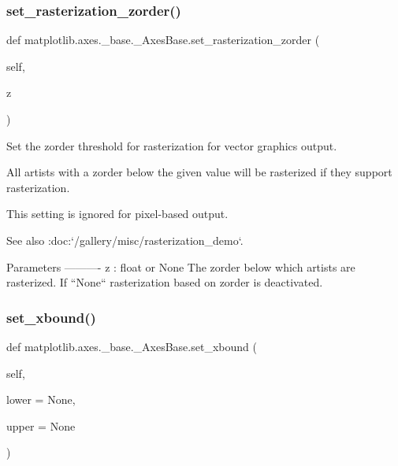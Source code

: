 \subsubsection{\texorpdfstring{set\+\_\+rasterization\+\_\+zorder()}{set\_rasterization\_zorder()}}
{\footnotesize\ttfamily def matplotlib.\+axes.\+\_\+base.\+\_\+\+Axes\+Base.\+set\+\_\+rasterization\+\_\+zorder (\begin{DoxyParamCaption}\item[{}]{self,  }\item[{}]{z }\end{DoxyParamCaption})}

\begin{DoxyVerb}Set the zorder threshold for rasterization for vector graphics output.

All artists with a zorder below the given value will be rasterized if
they support rasterization.

This setting is ignored for pixel-based output.

See also :doc:`/gallery/misc/rasterization_demo`.

Parameters
----------
z : float or None
    The zorder below which artists are rasterized.
    If ``None`` rasterization based on zorder is deactivated.
\end{DoxyVerb}
 \mbox{\label{classmatplotlib_1_1axes_1_1__base_1_1__AxesBase_ab95ea6eb5d87d4662c1fec40a396f08d}} 
\subsubsection{\texorpdfstring{set\+\_\+xbound()}{set\_xbound()}}
{\footnotesize\ttfamily def matplotlib.\+axes.\+\_\+base.\+\_\+\+Axes\+Base.\+set\+\_\+xbound (\begin{DoxyParamCaption}\item[{}]{self,  }\item[{}]{lower = {\ttfamily None},  }\item[{}]{upper = {\ttfamily None} }\end{DoxyParamCaption})}

